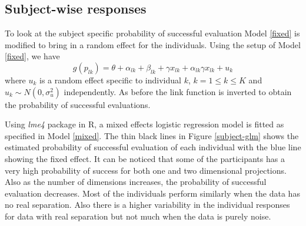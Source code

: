 \documentclass[12]{article}
\begin{document}


\subsection{Subject-wise responses}

To look at the subject specific probability of successful evaluation Model \ref{fixed} is modified to bring in  a random effect for the individuals. Using the setup of Model \ref{fixed}, we have
\begin{equation}
g(p_{lk}) = \theta + \alpha_{lk} + \beta_{lk} + \gamma x_{lk} + \alpha_{lk} \gamma x_{lk} + u_k \label{mixed} 
\end{equation}
where $u_k$ is a random effect specific to individual $k$, $k = 1 \leq k \leq K$ and $u_k \sim N(0, \sigma_u^2)$ independently. As before the link function is inverted to obtain the probability of successful evaluations.

Using \textit{lme4} package in R, a mixed effects logistic regression model is fitted as specified in Model \ref{mixed}. The thin black lines in Figure \ref{subject-glm} shows the estimated probability of successful evaluation of each individual with the blue line showing the fixed effect. It can be noticed that some of the participants has a very high probability of success for both one and two dimensional projections. Also as the number of dimensions increases, the probability of successful evaluation decreases. Most of the individuals perform similarly when the data has no real separation. Also there is a higher variability in the individual responses for data with real separation but not much when the data is purely noise.
\end{document}
